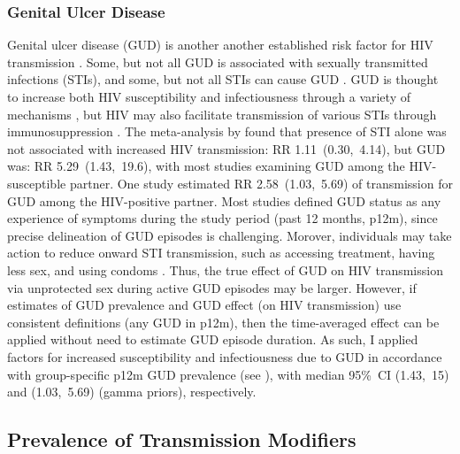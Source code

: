 \subsubsection{Genital Ulcer Disease}\label{model.par.beta.gud}
Genital ulcer disease (GUD)
is another another established risk factor for HIV transmission \cite{Plummer1991,Fleming1999}.
Some, but not all GUD is associated with sexually transmitted infections (STIs),
and some, but not all STIs can cause GUD \cite{Fleming1999}.
GUD is thought to increase both HIV susceptibility and infectiousness
through a variety of mechanisms \cite{Fleming1999,Sheffield2007,Fox2010},
but HIV may also facilitate transmission of various STIs
through immunosuppression \cite{Wasserheit1992}.
The meta-analysis by \citet{Boily2009} found that
presence of STI alone was not associated with increased HIV transmission: RR 1.11~(0.30,~4.14),
but GUD was: RR 5.29~(1.43,~19.6),
with most studies examining GUD among the HIV-susceptible partner.
One study \cite{Gray2001} estimated RR 2.58~(1.03,~5.69) of transmission
for GUD among the HIV-positive partner.
Most studies defined GUD status as any experience of symptoms during the study period
(\eg past 12 months, p12m),
since precise delineation of GUD episodes is challenging.
Morover, individuals may take action to reduce onward STI transmission,
such as accessing treatment, having less sex, and using condoms \cite{SDHS2006}.
Thus, the true effect of GUD on HIV transmission
via unprotected sex during active GUD episodes may be larger.
However, if estimates of GUD prevalence and GUD effect (on HIV transmission)
use consistent definitions (\eg any GUD in p12m),
then the time-averaged effect can be applied without need to estimate GUD episode duration.
As such, I applied factors for increased susceptibility and infectiousness due to GUD
in accordance with group-specific p12m GUD prevalence (see ),
with median 95\%~CI (1.43,~15) and (1.03,~5.69) (gamma priors), respectively.
\subsection{Prevalence of Transmission Modifiers}\label{model.par.tm}
